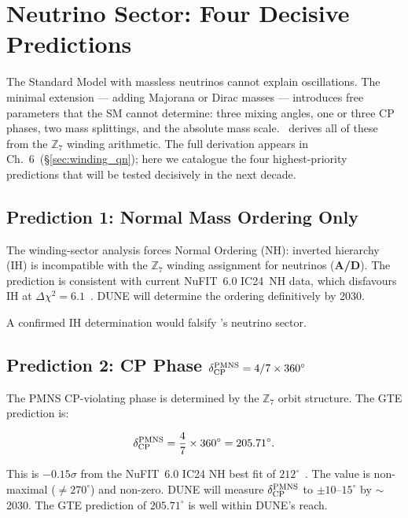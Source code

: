 \documentclass[11pt,openany]{book}
\theoremstyle{remark}
\newcommand{\GTE}{\text{GTE}}
\newcommand{\ZS}{\mathbb{Z}_7}
\newcommand{\CatAD}{\textbf{A/D}}
\begin{document}
\section{Neutrino Sector: Four Decisive Predictions}
\label{sec:neutrino_new_physics}

The Standard Model with massless neutrinos cannot explain oscillations.  The minimal
extension --- adding Majorana or Dirac masses --- introduces free parameters that the SM
cannot determine: three mixing angles, one or three CP phases, two mass splittings, and
the absolute mass scale.  \GTE\ derives all of these from the $\ZS$ winding arithmetic.
The full derivation appears in Ch.~6~(\S\ref{sec:winding_qn}); here we catalogue the
four highest-priority predictions that will be tested decisively in the next decade.

\subsection*{Prediction 1: Normal Mass Ordering Only}

The winding-sector analysis forces Normal Ordering (NH): inverted hierarchy (IH) is
incompatible with the $\ZS$ winding assignment for neutrinos (\CatAD).  The prediction
is consistent with current NuFIT~6.0 IC24~NH data, which disfavours IH at
$\Delta\chi^2 = 6.1$~\cite{NuFIT60}.  DUNE will determine the ordering definitively by
2030.

A confirmed IH determination would falsify \GTE's neutrino sector.

\subsection*{Prediction 2: CP Phase $\delta_{\rm CP}^{\rm PMNS} = 4/7 \times 360^\circ$}

The PMNS CP-violating phase is determined by the $\ZS$ orbit structure.  The GTE
prediction is:

\begin{equation}
\delta_{\rm CP}^{\rm PMNS} = \frac{4}{7} \times 360^\circ = 205.71^\circ.
\end{equation}

This is $-0.15\sigma$ from the NuFIT~6.0 IC24 NH best fit of $212^\circ$~\cite{NuFIT60}.
The value is non-maximal ($\neq 270^\circ$) and non-zero.  DUNE will measure
$\delta_{\rm CP}^{\rm PMNS}$ to $\pm10$--$15^\circ$ by $\sim$2030.  The GTE prediction
of $205.71^\circ$ is well within DUNE's reach.
\end{document}
